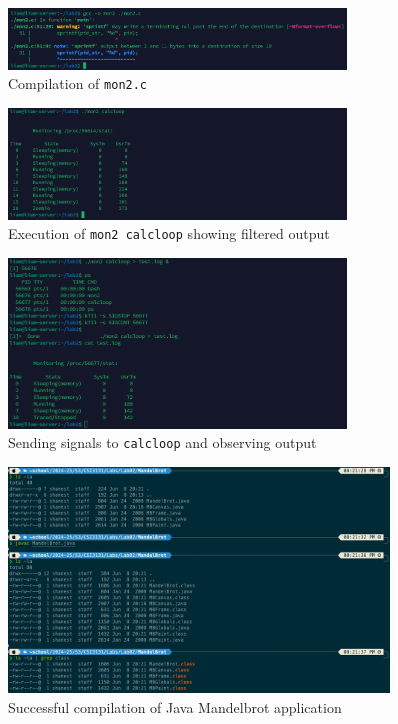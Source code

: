\documentclass[a4paper,12pt]{article}
\begin{document}
\begin{figure}[H]
    \centering
    \includegraphics[width=0.8\textwidth]{mon2_compilation.png}
    \caption{Compilation of \texttt{mon2.c}}
    \label{fig:mon2_compile}
\end{figure}

\begin{figure}[H]
    \centering
    \includegraphics[width=0.8\textwidth]{mon2_output.png}
    \caption{Execution of \texttt{mon2 calcloop} showing filtered output}
    \label{fig:mon2_output}
\end{figure}

\begin{figure}[H]
    \centering
    \includegraphics[width=0.8\textwidth]{mon2_signals.png}
    \caption{Sending signals to \texttt{calcloop} and observing output}
    \label{fig:mon2_signals}
\end{figure}

\begin{figure}[H]
    \centering
    \includegraphics[width=0.9\textwidth]{lab02-img01}
    \caption{Successful compilation of Java Mandelbrot application}
    \label{fig:java_compile}
\end{figure}
\end{document}
